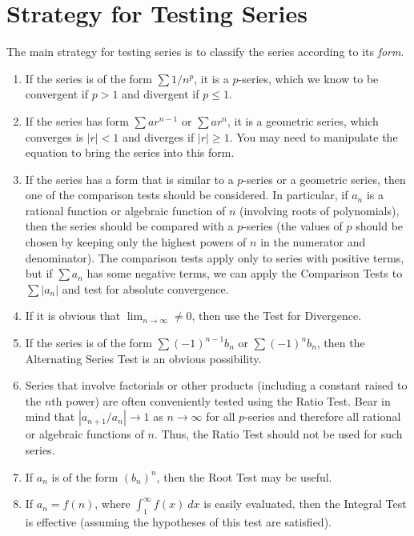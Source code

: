 \section{Strategy for Testing Series}
  The main strategy for testing series is to classify the series according to its \textit{form}.
  \begin{enumerate}
    \item If the series is of the form $\sum 1/n^p$, it is a $p$-series, which we know to be convergent if $p>1$ and divergent if $p \leq 1$.
    \item If the series has form $\sum ar^{n-1}$ or $\sum ar^{n}$, it is a geometric series, which converges is $|r|<1$ and diverges if $|r|\geq 1$. You may need to manipulate the equation to bring the series into this form.
    \item If the series has a form that is similar to a $p$-series or a geometric series, then one of the comparison tests should be considered. In particular, if $a_n$ is a rational function or algebraic function of $n$ (involving roots of polynomials), then the series should be compared with a $p$-series (the values of $p$ should be chosen by keeping only the highest powers of $n$ in the numerator and denominator). The comparison tests apply only to series with positive terms, but if $\sum a_n$ has some negative terms, we can apply the Comparison Tests to $\sum |a_n|$ and test for absolute convergence.
    \item If it is obvious that $\lim_{n\to\infty} \neq 0$, then use the Test for Divergence.
    \item If the series is of the form $\sum (-1)^{n-1}b_n$ or $\sum (-1)^{n}b_n$, then the Alternating Series Test is an obvious possibility.
    \item Series that involve factorials or other products (including a constant raised to the $n$th power) are often conveniently tested using the Ratio Test. Bear in mind that $|a_{n+1}/a_n| \to 1$ as $n\to\infty$ for all $p$-series and therefore all rational or algebraic functions of $n$. Thus, the Ratio Test should not be used for such series.
    \item If $a_n$ is of the form $(b_n)^n$, then the Root Test may be useful.
    \item If $a_n=f(n)$, where $\int_{1}^{\infty} f(x)\ dx$ is easily evaluated, then the Integral Test is effective (assuming the hypotheses of this test are satisfied).
  \end{enumerate}
